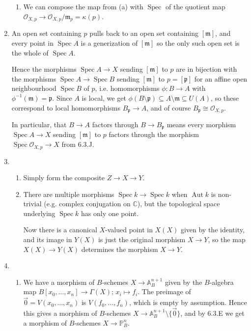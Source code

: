 \documentclass{report}
\newcommand{\m}{\mathfrak{m}}
\newcommand{\p}{\mathfrak{p}}
\renewcommand{\O}{\mathscr{O}} %
\newcommand{\A}{\mathbb{A}}
\renewcommand{\P}{\mathbb{P}} %
\newcommand{\C}{\mathbb{C}}
\DeclareMathOperator{\Aut}{Aut}
\DeclareMathOperator{\Spec}{Spec}
\begin{document}
\begin{enumerate}[label=\textbf{6.3.\Alph*.}]
\begin{enumerate}[label=(\alph*)]
		      \item We can compose the map from (a) with $\Spec$ of the quotient
		            map $\O_{X,p}\to\O_{X,p}/\m_p=\kappa(p)$.
	      \end{enumerate}

	\item An open set containing $p$ pulls back to an open set containing
	      $[\m]$, and every point in $\Spec A$ is a generization of $[\m]$ so
	      the only such open set is the whole of $\Spec A$.

	      Hence the morphisms $\Spec A\to X$ sending $[\m]$ to $p$ are in
	      bijection with the morphisms $\Spec A\to\Spec B$ sending $[\m]$ to
	      $p=[\p]$ for an affine open neighbourhood $\Spec B$ of $p$, i.e.
	      homomorphisms $\phi:B\to A$ with $\phi^{-1}(\m)=\p$. Since $A$ is
	      local, we get $\phi(B\setminus\p)\subseteq A\setminus\m\subseteq U(A)$,
	      so these correspond to local homomorphisms $B_\p\to A$, and of course
	      $B_\p\cong\O_{X,p}$.

	      In particular, that $B\to A$ factors through $B\to B_\p$ means every
	      morphism $\Spec A\to X$ sending $[\m]$ to $p$ factors through the
	      morphism $\Spec\O_{X,p}\to X$ from 6.3.J.

	\item
	      \begin{enumerate}[label=(\alph*)]
		      \item Simply form the composite $Z\to X\to Y$.

		      \item There are multiple morphisms $\Spec k\to\Spec k$ when
		            $\Aut k$ is non-trivial (e.g. complex conjugation on $\C$),
		            but the topological space underlying $\Spec k$ has only one
		            point.

		            Now there is a canonical $X$-valued point in $X(X)$ given by
		            the identity, and its image in $Y(X)$ is just the original
		            morphism $X\to Y$, so the map $X(X)\to Y(X)$ determines the
		            morphism $X\to Y$.
	      \end{enumerate}

	\item
	      \begin{enumerate}[label=(\alph*)]
		      \item We have a morphism of $B$-schemes $X\to\A^{n+1}_B$ given by
		            the $B$-algebra map $B[x_0,\ldots,x_n]\to\Gamma(X)$;
		            $x_i\mapsto f_i$. The preimage of $\vec0=V(x_0,\ldots,x_n)$ is
		            $V(f_0,\ldots,f_n)$, which is empty by assumption. Hence this
		            gives a morphism of $B$-schemes
		            $X\to\A^{n+1}_B\setminus\{\vec0\}$, and by 6.3.E we get a
		            morphism of $B$-schemes $X\to\P^n_B$.


\end{enumerate}
\end{enumerate}
\end{document}
